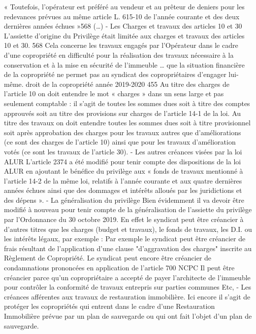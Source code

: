 « Toutefois, l’opérateur est préféré au vendeur et au prêteur de deniers pour les redevances prévues au même article L. 615-10 de l’année courante et des deux dernières années échues »568 (…)
- Les Charges et travaux des articles 10 et 30
L’assiette d’origine du Privilège était limitée aux charges et travaux des articles 10 et 30.
568 Cela concerne les travaux engagés par l’Opérateur dans le cadre d’une copropriété en difficulté pour la réalisation des travaux nécessaire à la conservation et à la mise en sécurité de l’immeuble … que la situation financière de la copropriété ne permet pas au syndicat des copropriétaires d’engager lui-même.
droit de la copropriété année 2019-2020
455
Au titre des charges de l’article 10 on doit entendre le mot « charges » dans un sens large et pas seulement comptable : il s’agit de toutes les sommes dues soit à titre des comptes approuvés soit au titre des provisions sur charges de l’article 14-1 de la loi.
Au titre des travaux on doit entendre toutes les sommes dues soit à titre provisionnel soit après approbation des charges pour les travaux autres que d’améliorations (ce sont des charges de l’article 10) ainsi que pour les travaux d’amélioration votés (ce sont les travaux de l’article 30).
- Les autres créances visées par la loi ALUR
L’article 2374 a été modifié pour tenir compte des dispositions de la loi ALUR en ajoutant le bénéfice du privilège aux « fonds de travaux mentionné à l'article 14-2 de la même loi, relatifs à l'année courante et aux quatre dernières années échues ainsi que des dommages et intérêts alloués par les juridictions et des dépens ».
- La généralisation du privilège
Bien évidemment il va devoir être modifié à nouveau pour tenir compte de la généralisation de l’assiette du privilège par l’Ordonnance du 30 octobre 2019.
En effet le syndicat peut être créancier à d’autres titres que les charges (budget et travaux), le fonds de travaux, les D.I. ou les intérêts légaux, par exemple :
Par exemple le syndicat peut être créancier de frais résultant de l'application d'une clause "d'aggravation des charges" inscrite au Règlement de Copropriété.
Le syndicat peut encore être créancier de condamnations prononcées en application de l’article 700 NCPC
Il peut être créancier parce qu’un copropriétaire a accepté de payer l’architecte de l’immeuble pour contrôler la conformité de travaux entrepris sur parties communes
Etc,
- Les créances afférentes aux travaux de restauration immobilière.
Ici encore il s’agit de protéger les copropriétés qui entrent dans le cadre d’une Restauration Immobilière prévue par un plan de sauvegarde ou qui ont fait l’objet d’un plan de sauvegarde.
